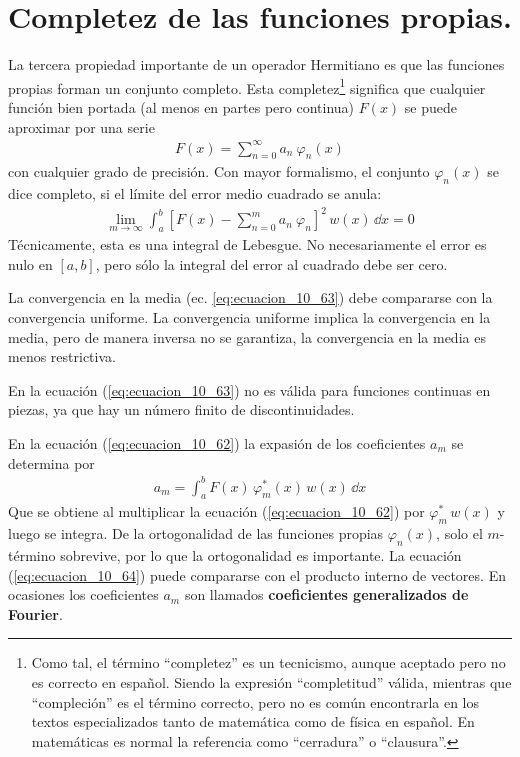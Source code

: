 \section{Completez de las funciones propias.}
La tercera propiedad importante de un operador Hermitiano es que las funciones propias forman un conjunto completo. Esta completez\footnote{Como tal, el término \enquote{completez} es un tecnicismo, aunque aceptado pero no es correcto en español. Siendo la expresión \enquote{completitud} válida, mientras que \enquote{compleción} es el término correcto, pero no es común encontrarla en los textos especializados tanto de matemática como de física en español. En matemáticas es normal la referencia como \enquote{cerradura} o \enquote{clausura}.} significa que cualquier función bien portada (al menos en partes pero continua) $F(x)$ se puede aproximar por una serie
\begin{align}
F(x) = \sum_{n=0}^{\infty} a_{n} \: \varphi_{n}(x) 
\label{eq:ecuacion_10_62}
\end{align}
con cualquier grado de precisión. Con mayor formalismo, el conjunto $\varphi_{n} (x)$ se dice completo, si el límite del error medio cuadrado se anula:
\begin{align}
\lim_{m \to \infty} \int_{a}^{b} \left[ F(x) - \sum_{n=0}^{m} a_{n} \: \varphi_{n} \right]^{2} \, w(x) \, \dd{x} = 0
\label{eq:ecuacion_10_63}
\end{align}
Técnicamente, esta es una integral de Lebesgue. No necesariamente el error es nulo en $[a,b]$, pero sólo la integral del error al cuadrado debe ser cero.
\par
La convergencia en la media (ec. \ref{eq:ecuacion_10_63}) debe compararse con la convergencia uniforme. La convergencia uniforme implica la convergencia en la media, pero de manera inversa no se garantiza, la convergencia en la media es menos restrictiva.
\par
En la ecuación (\ref{eq:ecuacion_10_63}) no es válida para funciones continuas en piezas, ya que hay un número finito de discontinuidades.
\par
 En la ecuación (\ref{eq:ecuacion_10_62}) la expasión de los coeficientes $a_{m}$ se determina por
\begin{align}
a_{m} = \int_{a}^{b} F(x) \, \varphi_{m}^{*} (x) \, w(x) \, \dd{x}
\label{eq:ecuacion_10_64}
\end{align}
Que se obtiene al multiplicar la ecuación (\ref{eq:ecuacion_10_62}) por $\varphi_{m}^{*} \, w(x)$ y luego se integra. De la ortogonalidad de las funciones propias $\varphi_{n}(x)$, solo el $m$-término sobrevive, por lo que la ortogonalidad es importante. La ecuación (\ref{eq:ecuacion_10_64}) puede compararse con el producto interno de vectores. En ocasiones los coeficientes $a_{m}$ son llamados \textbf{coeficientes generalizados de Fourier}.
